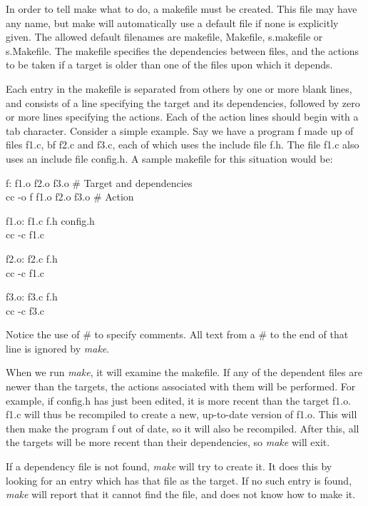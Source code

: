 In order to tell {\cmd make} what to do, a {\kc makefile} must be
created. This file may have any name, but {\cmd make} will
automatically use a default file if none is explicitly given. The
allowed default filenames are {\fn makefile}, {\fn Makefile}, {\fn
s.makefile} or {\fn s.Makefile}. The makefile specifies the
dependencies between files, and the actions to be taken if a {\kc
target\/} is older than one of the files upon which it depends.

Each entry in the makefile is separated from others by one or more
blank lines, and consists of a line specifying the target and its
dependencies, followed by zero or more lines specifying the actions.
Each of the action lines should begin with a {\sc tab} character.
Consider a simple example. Say we have a program {\cd f} made up of files
{\cd f1.c}, {\cd bf f2.c} and {\cd f3.c}, each of which uses the
include file {\cd f.h}. The file {\cd f1.c} also uses an include file
{\cd config.h}. A sample makefile for this situation would be:
\begin{code}
f: f1.o f2.o f3.o	 \tab	\# Target and dependencies \\
\>	cc -o f f1.o f2.o f3.o \tab \# Action			  \addVspace

f1.o: f1.c f.h config.h								  \\
\>	cc -c f1.c												  \addVspace

f2.o: f2.c f.h											  \\
\>	cc -c f1.c												  \addVspace

f3.o: f3.c f.h											  \\
\>	cc -c f3.c												  
\end{code}
\noindent
 Notice the use of {\cd \#} to specify comments. All text from a {\cd
\#} to the end of that line is ignored by {\em make}.

When we run {\em make}, it will examine the makefile. If any of the
dependent files are newer than the targets, the actions associated with
them will be performed. For example, if {\cd config.h} has just
been edited, it is more recent than the target {\cd f1.o}. {\cd f1.c}
will thus be recompiled to create a new, up-to-date version of {\cd
f1.o}. This will then make the program {\cd f} out of date, so it
will also be recompiled. After this, all the targets will be more
recent than their dependencies, so {\em make} will exit.

If a dependency file is not found, {\em make} will try to create it.
It does this by looking for an entry which has that file as the
target. If no such entry is found, {\em make} will report that it
cannot find the file, and does not know how to make it.

